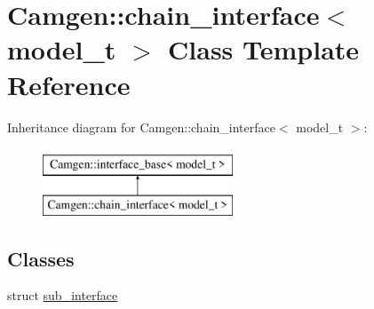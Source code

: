 \hypertarget{a00066}{\section{Camgen\-:\-:chain\-\_\-interface$<$ model\-\_\-t $>$ Class Template Reference}
\label{a00066}
}
Inheritance diagram for Camgen\-:\-:chain\-\_\-interface$<$ model\-\_\-t $>$\-:\begin{figure}[H]
\begin{center}
\leavevmode
\includegraphics[height=2.000000cm]{a00066}
\end{center}
\end{figure}
\subsection*{Classes}
\begin{DoxyCompactItemize}
\item 
struct \hyperlink{a00512}{sub\-\_\-interface}
\end{DoxyCompactItemize}
